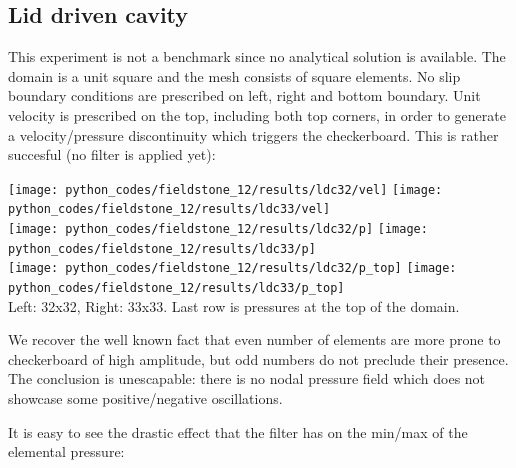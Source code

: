 \newpage
\subsection*{Lid driven cavity}

This experiment is not a benchmark since no analytical solution is available.
The domain is a unit square and the mesh consists of square elements. 
No slip boundary conditions are prescribed 
on left, right and bottom boundary. Unit velocity is prescribed on the top, 
including both top corners, in order to generate a velocity/pressure discontinuity  
which triggers the checkerboard. This is rather succesful (no filter is applied yet):

\begin{center}
\texttt{[image: python\_codes/fieldstone\_12/results/ldc32/vel]}
\texttt{[image: python\_codes/fieldstone\_12/results/ldc33/vel]}\\
\texttt{[image: python\_codes/fieldstone\_12/results/ldc32/p]}
\texttt{[image: python\_codes/fieldstone\_12/results/ldc33/p]}\\
\texttt{[image: python\_codes/fieldstone\_12/results/ldc32/p\_top]}
\texttt{[image: python\_codes/fieldstone\_12/results/ldc33/p\_top]}\\
{\captionfont Left: 32x32, Right: 33x33. Last row is pressures at the top of the domain.}
\end{center}

We recover the well known fact that even number of elements are more prone to 
checkerboard of high amplitude, but odd numbers do not preclude their presence.
The conclusion is unescapable: there is no nodal pressure field which does not 
showcase some positive/negative oscillations.

It is easy to see the drastic effect that the filter has on the min/max of the elemental pressure:

